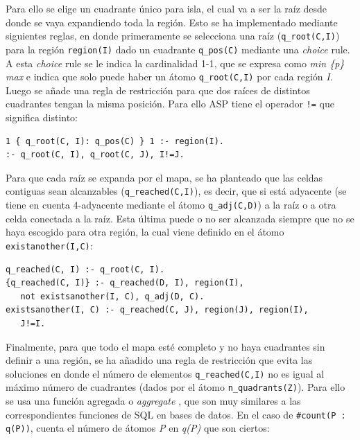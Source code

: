 Para ello se elige un cuadrante único para isla, el cual va a ser la raíz desde donde se vaya expandiendo toda la región. Esto se ha implementado mediante siguientes reglas, en donde primeramente se selecciona una raíz (\texttt{q\_root(C,I)}) para la región \texttt{region(I)} dado un cuadrante \texttt{q\_pos(C)} mediante una \textit{choice} rule. A esta \textit{choice} rule se le indica la cardinalidad 1-1, que se expresa como \textit{min \{p\} max} e indica que solo puede haber un átomo \texttt{q\_root(C,I)} por cada región \textit{I}. Luego se añade una regla de restricción para que dos raíces de distintos cuadrantes tengan la misma posición. Para ello ASP tiene el operador \texttt{!=} que significa distinto: \\

\begin{lstlisting}[label=lst:qroot]
1 { q_root(C, I): q_pos(C) } 1 :- region(I).
:- q_root(C, I), q_root(C, J), I!=J.
\end{lstlisting}

\hspace{1em}

Para que cada raíz se expanda por el mapa, se ha planteado que las celdas contiguas sean alcanzables (\texttt{q\_reached(C,I)}), es decir, que si está adyacente (se tiene en cuenta 4-adyacente mediante el átomo \texttt{q\_adj(C,D)}) a la raíz o a otra celda conectada a la raíz. Esta última puede o no ser alcanzada siempre que no se haya escogido para otra región, la cual viene definido en el átomo \texttt{existanother(I,C)}: \\

\begin{lstlisting}[label=lst:qreached]
q_reached(C, I) :- q_root(C, I).
{q_reached(C, I)} :- q_reached(D, I), region(I), 
   not existsanother(I, C), q_adj(D, C).
existsanother(I, C) :- q_reached(C, J), region(J), region(I),
   J!=I.
\end{lstlisting}

\hspace{1em}

Finalmente, para que todo el mapa esté completo y no haya cuadrantes sin definir a una región, se ha añadido una regla de restricción que evita las soluciones en donde el número de elementos \texttt{q\_reached(C,I)} no es igual al máximo número de cuadrantes (dados por el átomo \texttt{n\_quadrants(Z)}). Para ello se usa una función agregada o \textit{aggregate} \cite{aggregate}, que son muy similares a las correspondientes funciones de SQL en bases de datos. En el caso de \texttt{\#count(P : q(P))}, cuenta el número de átomos \textit{P} en \textit{q(P)} que son ciertos: \\

